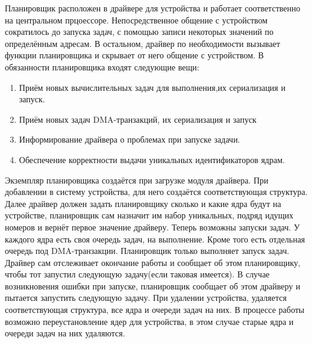 Планировщик расположен в драйвере для
устройства и работает соответственно на центральном прцоессоре.
Непосредственное общение с устройством сократилось до запуска задач, с помощью
записи некоторых значений по определённым адресам. В остальном, драйвер по
необходимости вызывает функции планировщика и скрывает от него общение с
устройством. В обязанности планировщика входят следующие вещи:
\begin{enumerate}
  \item Приём новых вычислительных задач для выполнения,их сериализация и
  запуск.
  \item Приём новых задач DMA-транзакций, их сериализация и запуск
  \item Информирование драйвера о проблемах при запуске задачи.
  \item Обеспечение корректности выдачи уникальных идентификаторов ядрам.
\end{enumerate}

Экземпляр планировщика создаётся при загрузке модуля драйвера. При добавлении в
систему устройства, для него создаётся соответствующая структура. Далее драйвер
должен задать планировщику сколько и какие ядра будут на устройстве, планировщик
сам назначит им набор уникальных, подряд идущих номеров и вернёт первое значение
драйверу. Теперь возможны запуски задач. У каждого ядра есть своя очередь задач,
на выполнение. Кроме того есть отдельная очередь под
DMA-транзакции.  Планировщик только выполняет запуск задач. Драйвер сам
отслеживает окончание работы и сообщает об этом планировщику, чтобы тот запустил
следующую задачу(если таковая имеется). В случае возникновения ошибки при
запуске, планировщик сообщает об этом драйверу и пытается запустить следующую
задачу. При удалении устройства, удаляется соответствующая структура, все ядра и
очереди задач на них. В процессе работы возможно переустановление ядер для
устройства, в этом случае старые ядра и очереди задач на них удаляются. 
